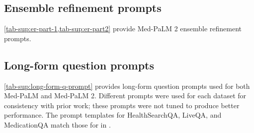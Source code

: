 \subsection{Ensemble refinement prompts}
\cref{tab-sup:er-part-1,tab-sup:er-part2} provide Med-PaLM 2 ensemble refinement prompts. 



\subsection{Long-form question prompts}
\label{sec-app:long-form-question-prompts}

\cref{tab-sup:long-form-q-prompt} provides long-form question prompts used for both Med-PaLM and Med-PaLM 2. Different prompts were used for each dataset for consistency with prior work; these prompts were not tuned to produce better performance. The prompt templates for HealthSearchQA, LiveQA, and MedicationQA match those for in \citet{singhal2022large}. 












